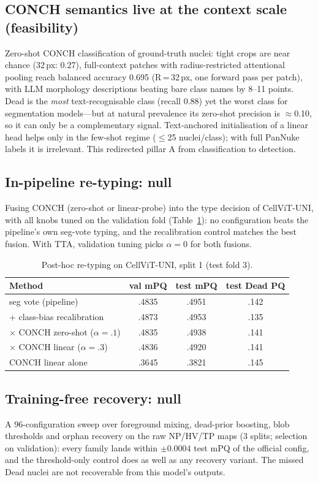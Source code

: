 \documentclass[11pt]{article}
\begin{document}
\subsection{CONCH semantics live at the context scale (feasibility)}
Zero-shot CONCH classification of ground-truth nuclei: tight crops are near chance (32\,px:
0.27), full-context patches with radius-restricted attentional pooling reach balanced accuracy
0.695 (R\,=\,32\,px, one forward pass per patch), with LLM morphology descriptions beating bare
class names by 8--11 points. Dead is the \emph{most} text-recognisable class (recall 0.88) yet
the worst class for segmentation models---but at natural prevalence its zero-shot precision is
$\approx$0.10, so it can only be a complementary signal. Text-anchored initialisation of a
linear head helps only in the few-shot regime ($\le$25 nuclei/class); with full PanNuke labels
it is irrelevant. This redirected pillar A from classification to detection.

\subsection{In-pipeline re-typing: null}
Fusing CONCH (zero-shot or linear-probe) into the type decision of CellViT-UNI, with all knobs
tuned on the validation fold (Table~\ref{tab:retype}): no configuration beats the pipeline's own
seg-vote typing, and the recalibration control matches the best fusion. With TTA, validation
tuning picks $\alpha=0$ for both fusions.

\begin{table}[t]
\centering\small
\caption{Post-hoc re-typing on CellViT-UNI, split 1 (test fold 3).}
\label{tab:retype}
\begin{tabular}{lccc}
\toprule
Method & val mPQ & test mPQ & test Dead PQ \\
\midrule
seg vote (pipeline)              & .4835 & .4951 & .142 \\
+ class-bias recalibration       & .4873 & .4953 & .135 \\
$\times$ CONCH zero-shot ($\alpha{=}.1$) & .4835 & .4938 & .141 \\
$\times$ CONCH linear ($\alpha{=}.3$)    & .4836 & .4920 & .141 \\
CONCH linear alone               & .3645 & .3821 & .145 \\
\bottomrule
\end{tabular}
\end{table}

\subsection{Training-free recovery: null}
A 96-configuration sweep over foreground mixing, dead-prior boosting, blob thresholds and
orphan recovery on the raw NP/HV/TP maps (3 splits; selection on validation): every family lands
within $\pm0.0004$ test mPQ of the official config, and the threshold-only control does as well as
any recovery variant. The missed Dead nuclei are not
recoverable from this model's outputs.
\end{document}
